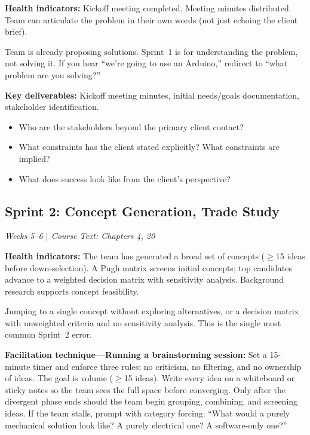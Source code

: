 \textbf{Health indicators:} Kickoff meeting completed. Meeting minutes distributed. Team can articulate the problem in their own words (not just echoing the client brief).

\begin{redflag}
Team is already proposing solutions. Sprint~1 is for understanding the problem, not solving it. If you hear ``we're going to use an Arduino,'' redirect to ``what problem are you solving?''
\end{redflag}

\textbf{Key deliverables:} Kickoff meeting minutes, initial needs/goals documentation, stakeholder identification.

\begin{paquestion}
\begin{itemize}[nosep,leftmargin=1.5em]
\item Who are the stakeholders beyond the primary client contact?
\item What constraints has the client stated explicitly? What constraints are implied?
\item What does success look like from the client's perspective?
\end{itemize}
\end{paquestion}


\subsection{Sprint 2: Concept Generation, Trade Study}
\textit{Weeks 5--6 $|$ Course Text: Chapters 4, 20}

\textbf{Health indicators:} The team has generated a broad set of concepts ($\geq$15 ideas before down-selection). A Pugh matrix screens initial concepts; top candidates advance to a weighted decision matrix with sensitivity analysis. Background research supports concept feasibility.

\begin{redflag}
Jumping to a single concept without exploring alternatives, or a decision matrix with unweighted criteria and no sensitivity analysis. This is the single most common Sprint~2 error.
\end{redflag}

\textbf{Facilitation technique---Running a brainstorming session:} Set a 15-minute timer and enforce three rules: no criticism, no filtering, and no ownership of ideas. The goal is volume ($\geq$15 ideas). Write every idea on a whiteboard or sticky notes so the team sees the full space before converging. Only after the divergent phase ends should the team begin grouping, combining, and screening ideas. If the team stalls, prompt with category forcing: ``What would a purely mechanical solution look like? A purely electrical one? A software-only one?''

